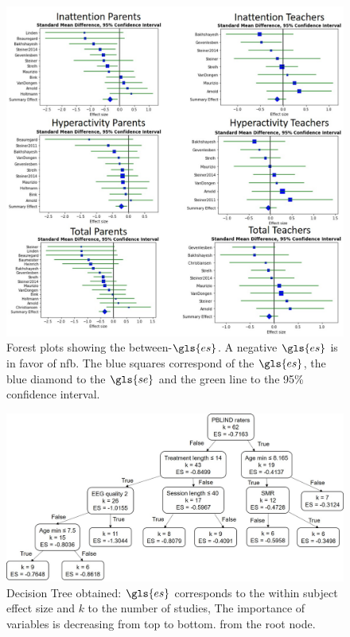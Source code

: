 \begin{figure}[h!]
  \centering
  \includegraphics[width=1.0\linewidth]{figures/meta_review_forest_plots_update_meta_analysis_our_choices_no_colors_2-columns_fitting_image.jpg}
  \caption{Forest plots showing the between-$\gls{es}$. A negative $\gls{es}$ is in favor of \gls{nfb}. 
	The blue squares correspond of the $\gls{es}$, the blue diamond to the $\gls{se}$ and the green line to the 95\% confidence interval.}
  \label{Figure:meta_review_forest_plots_update_meta_analysis_our_choices_no_colors_2-columns_fitting_image}
\end{figure}

\begin{figure}[h!]
  \centering
  \includegraphics[width=1.0\linewidth]{figures/factors_analysis_decision_tree_results_no_colors_2-columns_fitting_image.jpg}
  \caption{Decision Tree obtained: $\gls{es}$ corresponds to the within subject effect size and $k$ to the number of studies, 
  The importance of variables is decreasing from top to bottom.
	from the root node.}
  \label{Figure:factors_analysis_decision_tree_results}
\end{figure}

